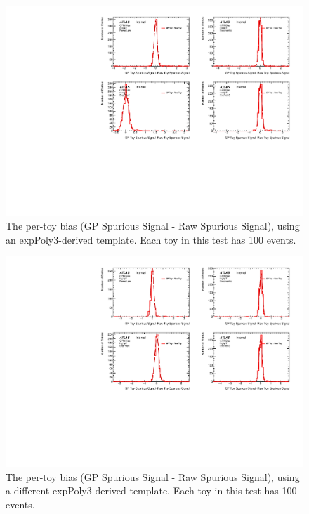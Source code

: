\begin{figure} 
\begin{center}
  \includegraphics[width=\textwidth]{figures/background/gpr/validation/nominal/ToyTest_FitSigBiases_medpT_100_noSig}   
\caption{The per-toy bias (GP Spurious Signal - Raw Spurious Signal), using an expPoly3-derived template. Each toy in this test has 100 events.}
\label{fig:bias_medpt_100_noSig}
\end{center}
\end{figure}

\begin{figure} 
\begin{center}
  \includegraphics[width=\textwidth]{figures/background/gpr/validation/nominal/ToyTest_FitSigBiases_highpT_100_noSig}   
\caption{The per-toy bias (GP Spurious Signal - Raw Spurious Signal), using a different expPoly3-derived template. Each toy in this test has 100 events.}
\label{fig:bias_highpt_100_noSig}
\end{center}
\end{figure}


